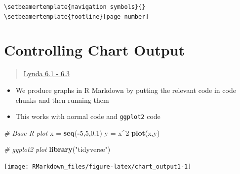 \documentclass[]{article}
\newenvironment{Shaded}{\begin{snugshade}}{\end{snugshade}}
\newcommand{\CommentTok}[1]{\textcolor[rgb]{0.56,0.35,0.01}{\textit{#1}}}
\newcommand{\DataTypeTok}[1]{\textcolor[rgb]{0.13,0.29,0.53}{#1}}
\newcommand{\DecValTok}[1]{\textcolor[rgb]{0.00,0.00,0.81}{#1}}
\newcommand{\FloatTok}[1]{\textcolor[rgb]{0.00,0.00,0.81}{#1}}
\newcommand{\KeywordTok}[1]{\textcolor[rgb]{0.13,0.29,0.53}{\textbf{#1}}}
\newcommand{\NormalTok}[1]{#1}
\newcommand{\OperatorTok}[1]{\textcolor[rgb]{0.81,0.36,0.00}{\textbf{#1}}}
\newcommand{\StringTok}[1]{\textcolor[rgb]{0.31,0.60,0.02}{#1}}
\providecommand{\tightlist}{%
  \setlength{\itemsep}{0pt}\setlength{\parskip}{0pt}}
\begin{document}
\begin{verbatim}
\setbeamertemplate{navigation symbols}{}
\setbeamertemplate{footline}[page number]
\end{verbatim}

\hypertarget{controlling-chart-output}{%
\section{Controlling Chart Output}\label{controlling-chart-output}}

\begin{quote}
\href{https://www.lynda.com/RStudio-tutorials/ggplot2-plots-R-Markdown-documents/699348/2800213-4.html?srchtrk=index\%3a1\%0alinktypeid\%3a2\%0aq\%3ar+markdown\%0apage\%3a1\%0as\%3arelevance\%0asa\%3atrue\%0aproducttypeid\%3a2}{Lynda
6.1 - 6.3}
\end{quote}

\begin{itemize}
\tightlist
\item
  We produce graphs in R Markdown by putting the relevant code in code
  chunks and then running them
\item
  This works with normal code and \texttt{ggplot2} code
\end{itemize}

\begin{Shaded}
\begin{Highlighting}[]
\CommentTok{# Base R plot}
\NormalTok{x =}\StringTok{ }\KeywordTok{seq}\NormalTok{(}\OperatorTok{-}\DecValTok{5}\NormalTok{,}\DecValTok{5}\NormalTok{,}\FloatTok{0.1}\NormalTok{)}
\NormalTok{y =}\StringTok{ }\NormalTok{x}\OperatorTok{^}\DecValTok{2}
\KeywordTok{plot}\NormalTok{(x,y)}

\CommentTok{# ggplot2 plot}
\KeywordTok{library}\NormalTok{(}\StringTok{"tidyverse"}\NormalTok{)}
\end{Highlighting}
\end{Shaded}

\begin{center}\texttt{[image: RMarkdown\_files/figure-latex/chart\_output1-1]} \end{center}

\begin{Shaded}
\end{Shaded}
\end{document}
